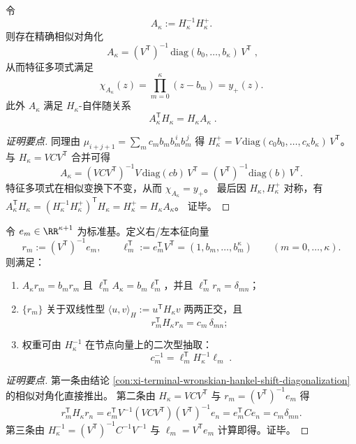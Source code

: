 \begin{conclusion}\label{con:xi-terminal-wronskian-hankel-shift-diagonalization}
令
\[
A_{\kappa}:=H_{\kappa}^{-1}H_{\kappa}^{+}.
\]
则存在精确相似对角化
\[
\boxed{\;
A_{\kappa}=(V^{\mathsf T})^{-1}\,\mathrm{diag}(b_0,\dots,b_\kappa)\,V^{\mathsf T}\;},
\]
从而特征多项式满足
\[
\chi_{A_{\kappa}}(z)=\prod_{m=0}^{\kappa}(z-b_m)=y_{+}(z).
\]
此外 \(A_{\kappa}\) 满足 \(H_{\kappa}\)-自伴随关系
\[
\boxed{\;
A_{\kappa}^{\mathsf T}H_{\kappa}=H_{\kappa}A_{\kappa}\; }.
\]
\end{conclusion}
\begin{proof}[证明要点]
同理由 \(\mu_{i+j+1}=\sum_m c_m b_m b_m^{\,i}b_m^{\,j}\) 得
\(
H_{\kappa}^{+}=V\,\mathrm{diag}(c_0b_0,\dots,c_\kappa b_\kappa)\,V^{\mathsf T}
\)。
与 \(H_{\kappa}=VCV^{\mathsf T}\) 合并可得
\[
A_{\kappa}=(VCV^{\mathsf T})^{-1}V\,\mathrm{diag}(cb)\,V^{\mathsf T}
=(V^{\mathsf T})^{-1}\mathrm{diag}(b)\,V^{\mathsf T}.
\]
特征多项式在相似变换下不变，从而 \(\chi_{A_{\kappa}}=y_{+}\)。
最后因 \(H_{\kappa},H_{\kappa}^{+}\) 对称，有
\(
A_{\kappa}^{\mathsf T}H_{\kappa}=(H_{\kappa}^{-1}H_{\kappa}^{+})^{\mathsf T}H_{\kappa}=H_{\kappa}^{+}=H_{\kappa}A_{\kappa}
\)。
证毕。
\end{proof}

\begin{conclusion}\label{con:xi-terminal-wronskian-hankel-weights-quadratic-extraction}
令 \(e_m\in\RR^{\kappa+1}\) 为标准基。定义右/左本征向量
\[
r_m:=(V^{\mathsf T})^{-1}e_m,\qquad
\ell_m^{\mathsf T}:=e_m^{\mathsf T}V^{\mathsf T}=(1,b_m,\dots,b_m^{\kappa})\qquad(m=0,\dots,\kappa).
\]
则满足：
\begin{enumerate}
  \item \(A_{\kappa}r_m=b_m r_m\) 且 \(\ell_m^{\mathsf T}A_{\kappa}=b_m \ell_m^{\mathsf T}\)，并且 \(\ell_m^{\mathsf T}r_n=\delta_{mn}\)；
  \item \(\{r_m\}\) 关于双线性型 \(\langle u,v\rangle_H:=u^{\mathsf T}H_{\kappa}v\) 两两正交，且
  \[
  r_m^{\mathsf T}H_{\kappa}r_n=c_m\,\delta_{mn};
  \]
  \item 权重可由 \(H_{\kappa}^{-1}\) 在节点向量上的二次型抽取：
  \[
  \boxed{\;
  c_m^{-1}=\ell_m^{\mathsf T}H_{\kappa}^{-1}\ell_m\; }.
  \]
\end{enumerate}
\end{conclusion}
\begin{proof}[证明要点]
第一条由结论 \ref{con:xi-terminal-wronskian-hankel-shift-diagonalization} 的相似对角化直接推出。
第二条由 \(H_{\kappa}=VCV^{\mathsf T}\) 与 \(r_m=(V^{\mathsf T})^{-1}e_m\) 得
\[
r_m^{\mathsf T}H_{\kappa}r_n
=e_m^{\mathsf T}V^{-1}(VCV^{\mathsf T})(V^{\mathsf T})^{-1}e_n
=e_m^{\mathsf T}Ce_n
=c_m\delta_{mn}.
\]
第三条由 \(H_{\kappa}^{-1}=(V^{\mathsf T})^{-1}C^{-1}V^{-1}\) 与 \(\ell_m=V^{\mathsf T}e_m\) 计算即得。证毕。
\end{proof}

